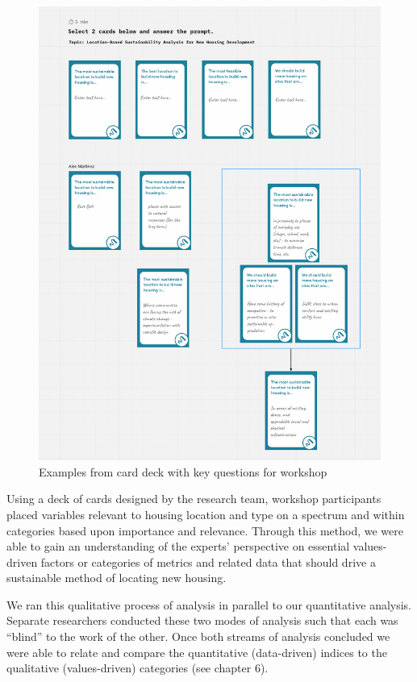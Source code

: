 \documentclass[
]{book}
\begin{document}
\begin{figure}
\includegraphics[width=1\linewidth]{04_figures/fig_3b} \caption{Examples from card deck with key questions for workshop}\label{fig:fig3b}
\end{figure}

Using a deck of cards designed by the research team, workshop participants placed variables relevant to housing location and type on a spectrum and within categories based upon importance and relevance. Through this method, we were able to gain an understanding of the experts' perspective on essential values-driven factors or categories of metrics and related data that should drive a sustainable method of locating new housing.

We ran this qualitative process of analysis in parallel to our quantitative analysis. Separate researchers conducted these two modes of analysis such that each was ``blind'' to the work of the other. Once both streams of analysis concluded we were able to relate and compare the quantitative (data-driven) indices to the qualitative (values-driven) categories (see chapter 6).
\end{document}
